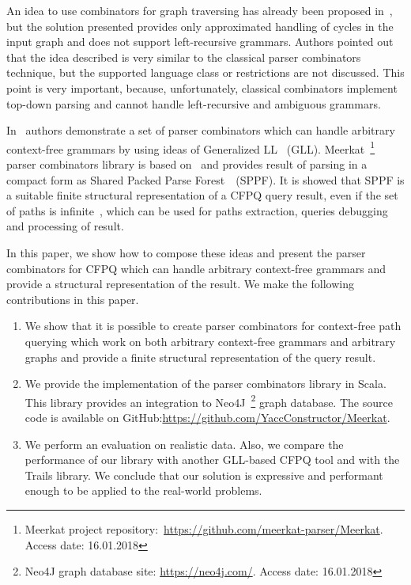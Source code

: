 An idea to use combinators for graph traversing has already been proposed in~\cite{ScalaGraphParsing}, but the solution presented provides only approximated handling of cycles in the input graph and does not support left-recursive grammars. 
Authors pointed out that the idea described is very similar to the classical parser combinators technique, but the supported language class or restrictions are not discussed.
This point is very important, because, unfortunately, classical combinators implement top-down parsing and cannot handle left-recursive and ambiguous grammars.

In~\cite{Meerkat} authors demonstrate a set of parser combinators which can handle arbitrary context-free grammars by using ideas of Generalized LL~\cite{scott2010gll} (GLL).
Meerkat~\footnote{Meerkat project repository:~\url{https://github.com/meerkat-parser/Meerkat}. Access date: 16.01.2018} parser combinators library is based on~\cite{Meerkat}
 and provides result of parsing in a compact form as Shared Packed Parse Forest~\cite{SPPF}~(SPPF).
It is showed that SPPF is a suitable finite structural representation of a CFPQ query result, even if the set of paths is infinite~\cite{GrigorevR16}, which can be used for paths extraction, queries debugging and processing of result.

In this paper, we show how to compose these ideas and present the parser combinators for CFPQ which can handle arbitrary context-free grammars and provide a structural representation of the result.
We make the following contributions in this paper.

\begin{enumerate}
\item We show that it is possible to create parser combinators for context-free path querying which work on both arbitrary context-free grammars and arbitrary graphs and provide a finite structural representation of the query result.
\item We provide the implementation of the parser combinators library in Scala. This library provides an integration to Neo4J~\footnote{Neo4J graph database site: \url{https://neo4j.com/}. Access date: 16.01.2018} graph database. The source code is available on GitHub:\url{https://github.com/YaccConstructor/Meerkat}.
\item We perform an evaluation on realistic data. 
Also, we compare the performance of our library with another GLL-based CFPQ tool and with the Trails library.
We conclude that our solution is expressive and performant enough to be applied to the real-world problems. 
\end{enumerate}